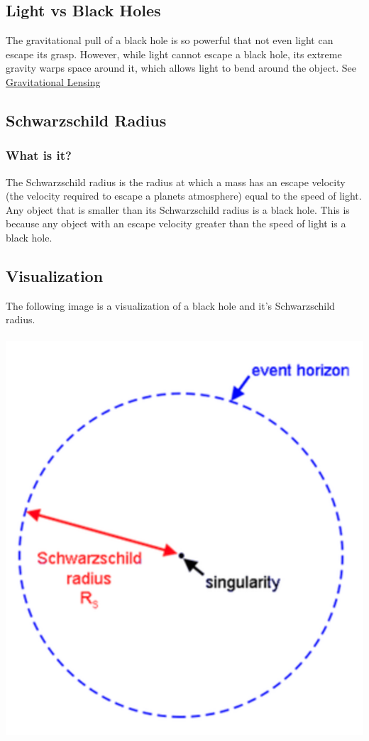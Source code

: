 \documentclass{article}
\begin{document}
\subsection{Light vs Black Holes}
The gravitational pull of a black hole is so powerful that not even light can escape its grasp. However, while light cannot escape a black hole, its extreme gravity warps space around it, which allows light to bend around the object. See \hyperref[sec:gravitational_lensing]{Gravitational Lensing}

\subsection{Schwarzschild Radius}
\subsubsection{What is it?}
The Schwarzschild radius is the radius at which a mass has an escape velocity (the velocity required to escape a planets atmosphere) equal to the speed of light. Any object that is smaller than its Schwarzschild radius is a black hole. This is because any object with an escape velocity greater than the speed of light is a black hole.

\subsection{Visualization}
The following image is a visualization of a black hole and it's Schwarzschild radius. \\\\
\includegraphics[scale=0.4]{images/schwarzschild_radius.png}
\end{document}
